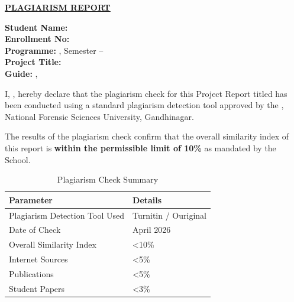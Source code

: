 \pagestyle{NFSUPageHFStyle}
\NFSUWatermarkOn

{\centering
	\par
	\large \textbf{\underline{PLAGIARISM REPORT}} \par
}\vspace{0.7cm}

\noindent\textbf{Student Name:} \StudentName \\
\noindent\textbf{Enrollment No:} \EnrollmentNo \\
\noindent\textbf{Programme:} \ProgramName, Semester -- \ProgramSemester \\
\noindent\textbf{Project Title:} \ProjectTitle \\
\noindent\textbf{Guide:} \SupervisorName, \SupervisorDesig \\

\vspace{0.5cm}

\noindent I, \textbf{\StudentName}, hereby declare that the plagiarism check for this Project Report titled \textbf{\ProjectTitle} has been conducted using a standard plagiarism detection tool approved by the \NFSUSchool, National Forensic Sciences University, Gandhinagar.\\

\vspace{0.3cm}

\noindent The results of the plagiarism check confirm that the overall similarity index of this report is \textbf{within the permissible limit of 10\%} as mandated by the School.\\

\vspace{0.5cm}

\begin{table}[h]
\centering
\caption{Plagiarism Check Summary}
\label{tab:plagiarism_summary}
\renewcommand{\arraystretch}{1.4}
\begin{tabular}{|l|l|}
\hline
\textbf{Parameter} & \textbf{Details} \\
\hline
Plagiarism Detection Tool Used & Turnitin / Ouriginal \\
\hline
Date of Check & April 2026 \\
\hline
Overall Similarity Index & \textless 10\% \\
\hline
Internet Sources & \textless 5\% \\
\hline
Publications & \textless 5\% \\
\hline
Student Papers & \textless 3\% \\
\hline
\end{tabular}
\end{table}

